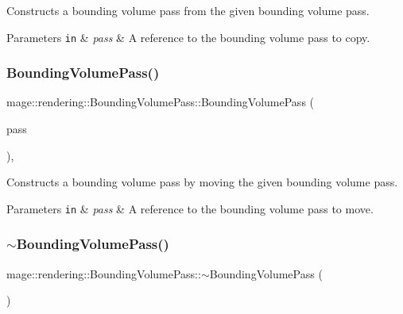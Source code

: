 Constructs a bounding volume pass from the given bounding volume pass.


\begin{DoxyParams}[1]{Parameters}
\mbox{\tt in}  & {\em pass} & A reference to the bounding volume pass to copy. \\
\hline
\end{DoxyParams}
\hypertarget{classmage_1_1rendering_1_1_bounding_volume_pass_a16f91c871dabbf6904606abad24d551f}{}\label{classmage_1_1rendering_1_1_bounding_volume_pass_a16f91c871dabbf6904606abad24d551f} 
\subsubsection{\texorpdfstring{Bounding\+Volume\+Pass()}{BoundingVolumePass()}\hspace{0.1cm}{\footnotesize\ttfamily [3/3]}}
{\footnotesize\ttfamily mage\+::rendering\+::\+Bounding\+Volume\+Pass\+::\+Bounding\+Volume\+Pass (\begin{DoxyParamCaption}\item[{\hyperlink{classmage_1_1rendering_1_1_bounding_volume_pass}{Bounding\+Volume\+Pass} \&\&}]{pass }\end{DoxyParamCaption})\hspace{0.3cm}{\ttfamily [default]}, {\ttfamily [noexcept]}}

Constructs a bounding volume pass by moving the given bounding volume pass.


\begin{DoxyParams}[1]{Parameters}
\mbox{\tt in}  & {\em pass} & A reference to the bounding volume pass to move. \\
\hline
\end{DoxyParams}
\hypertarget{classmage_1_1rendering_1_1_bounding_volume_pass_a6a70806bfad252e2a6409c94a0de7da7}{}\label{classmage_1_1rendering_1_1_bounding_volume_pass_a6a70806bfad252e2a6409c94a0de7da7} 
\subsubsection{\texorpdfstring{$\sim$\+Bounding\+Volume\+Pass()}{~BoundingVolumePass()}}
{\footnotesize\ttfamily mage\+::rendering\+::\+Bounding\+Volume\+Pass\+::$\sim$\+Bounding\+Volume\+Pass (\begin{DoxyParamCaption}{ }\end{DoxyParamCaption})\hspace{0.3cm}{\ttfamily [default]}}

